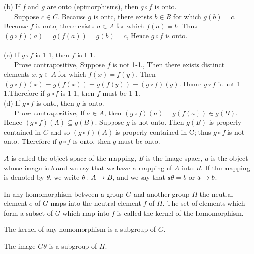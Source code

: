(b) If $f$ and $g$ are onto (epimorphisms), then $g\circ f$ is onto.\\
~~~Suppose $c \in C$. Because $g$ is onto, there exists $b \in B$ for which $g(b) = c$. Because $f$ is onto, there exists $a\in A$ for which $f(a) = b$. Thus  $(g\circ f)(a) = g(f(a)) = g(b) = c$, Hence $g\circ f$ is onto. \\ \\

(c) If $g\circ f$ is 1-1, then $f$ is 1-1.\\ 
~~~Prove contrapositive, Suppose $f$ is  not 1-1., Then there exists distinct elements $x,y \in A$ for which $f(x) = f(y)$. Then $(g\circ f)(x) = g(f(x)) = g(f(y)) = (g\circ f)(y)$. Hence $g\circ f$ is not 1-1.Therefore if $g\circ f$ is 1-1, then $f$ must be 1-1.\\

(d) If $g\circ f$ is onto, then $g$ is onto.\\
~~~Prove contrapositive, If $a \in A$, then $(g\circ f)(a) = g(f(a)) \in g(B)$. Hence $(g\circ f)(A) \subseteq g(B)$. 
Suppose $g$ is not onto. Then $g(B)$ is properly contained in $C$ and so $(g\circ f)(A)$ is properly contained in C; thus $g\circ f$ is not onto. Therefore if $g\circ f$ is onto, then $g$ must be onto.\\

\begin{definition}
$A$ is called the object space of the mapping, $B$ is the image space, $a$ is the object whose image is $b$ and we say that we have a mapping of $A$ into $B$. If the mapping is denoted by $\theta$, we write 
$\theta : A \rightarrow B$, and we say that $a\theta = b$ or $a \rightarrow b$. 
\end{definition}

In any homomorphism between a group $G$ and another group $H$ the neutral element $e$ of $G$ maps into the neutral element $f$ of $H$. The set of elements which form a subset of $G$ which map into $f$ is called the {\twelveit kernel} of the homomorphism. 

\begin{theorem}
The kernel of any homomorphism is a subgroup of $G$. \label{kernel}
\end{theorem}

\begin{theorem}
The image $G\theta$ is a subgroup of $H$.  \label{image}
\end{theorem}